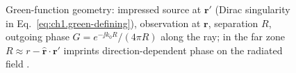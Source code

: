 \begin{figure}[t]
\centering
\VolIPhysFig{\VolIPhysGreenFunctionGeometry}
\caption{Green-function geometry: impressed source at $\mathbf{r}'$ (Dirac singularity in Eq.~\eqref{eq:ch1.green-defining}), observation at $\mathbf{r}$, separation $R$, outgoing phase $G=e^{-\jj k_0 R}/(4\pi R)$ along the ray; in the far zone $R\approx r-\hat{\mathbf{r}}\cdot\mathbf{r}'$ imprints direction-dependent phase on the radiated field \cite{stratton1941,jackson1999,tai1994}.}
\label{fig:ch1.green-function-seed}
\end{figure}
